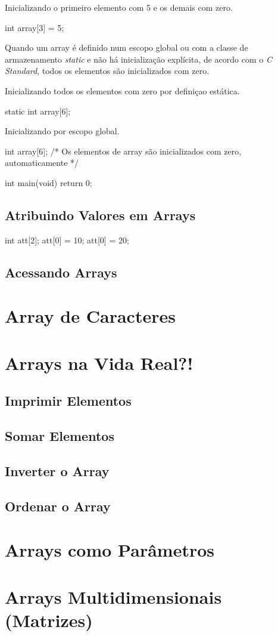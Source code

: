 Inicializando o primeiro elemento com 5 e os demais com zero.

\begin{ccode}
  int array[3] = {5};
\end{ccode}

Quando um array é definido num escopo global ou com a classe de armazenamento \textit{static} e não há inicialização explícita, de acordo com o \textit{C Standard}, todos os elementos são inicializados com zero.

Inicializando todos os elementos com zero por definiçao estática.

\begin{ccode}
  static int array[6];
\end{ccode}

Inicializando por escopo global.

\begin{ccode}
int array[6];    /* Os elementos de array são inicializados
                    com zero, automaticamente */

int main(void)
{
  return 0;
}
\end{ccode}

\subsection{Atribuindo Valores em Arrays}

\begin{ccode}
  int att[2];
  att[0] = 10;
  att[0] = 20;
\end{ccode}

\subsection{Acessando Arrays}

\section{Array de Caracteres}

\section{Arrays na Vida Real?!}
\subsection{Imprimir Elementos}
\subsection{Somar Elementos}
\subsection{Inverter o Array}
\subsection{Ordenar o Array}

\section{Arrays como Parâmetros}

\section{Arrays Multidimensionais (Matrizes)}


